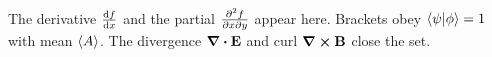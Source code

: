 \documentclass{article}
\begin{document}
The derivative $\dv{f}{x}$ and the partial $\pdv{f}{x}{y}$ appear here.
Brackets obey $\bra{\psi}\ket{\phi} = 1$ with mean $\expval{A}$.
The divergence $\div{\vb{E}}$ and curl $\curl{\vb{B}}$ close the set.
\end{document}
